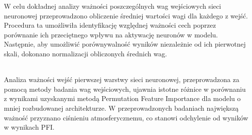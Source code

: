 \documentclass[a4paper,twoside,12pt]{book}
\begin{document}
W celu dokładnej analizy ważności poszczególnych wag wejściowych sieci neuronowej przeprowadzono obliczenie średniej wartości wagi dla każdego z wejść. Procedura ta umożliwiła identyfikację względnej ważności cech poprzez porównanie ich przeciętnego wpływu na aktywację neuronów w modelu. Następnie, aby umożliwić porównywalność wyników niezależnie od ich pierwotnej skali, dokonano normalizacji obliczonych średnich wag.
\begin{table}[!h]
	\centering
	\caption{Porównianie wag wejściowych dla pierwszej warstwy uproszczonego modelu}
\end{table}\\

Analiza ważności wejść pierwszej warstwy sieci neuronowej, przeprowadzona za pomocą metody badania wag wejściowych, ujawnia istotne różnice w porównaniu z wynikami uzyskanymi metodą Permutation Feature Importance dla modelu o mniej rozbudowanej architekturze. W przeprowadzonych badaniach największą ważność przyznano ciśnieniu atmosferycznemu, co stanowi odchylenie od wyników w wynikach PFI.
\end{document}
